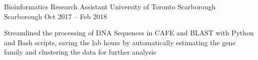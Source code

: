 \begin{cventries}
  \cventry
    {Bioinformatics Research Assistant}
    {University of Toronto Scarborough}
    {Scarborough}
    {Oct 2017 -- Feb 2018}
    {}
    {
      \begin{cvitems}
        \item {Streamlined the processing of DNA Sequences in CAFE and BLAST with Python and Bash scripts, saving the lab hours by automatically estimating the gene family and clustering the data for further analysis}
      \end{cvitems}
    }
\end{cventries}
